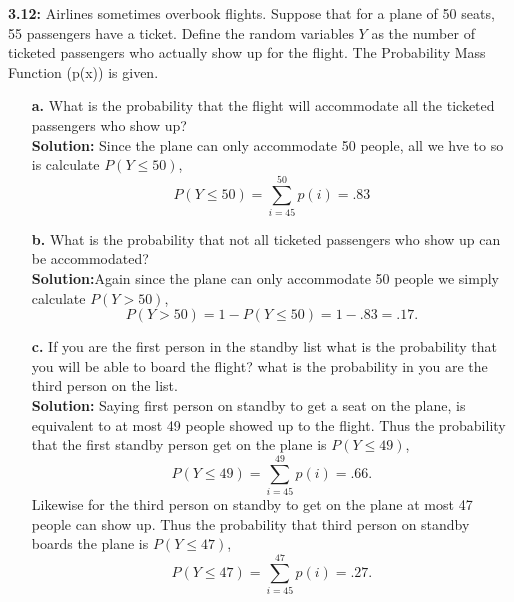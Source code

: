 \documentclass[12pt]{article}
\theoremstyle{homework}
\begin{document}
\textbf{3.12:} Airlines sometimes overbook flights. Suppose that for a plane of 50 seats, 55 passengers have a ticket. Define the random variables $Y$
as the number of ticketed passengers who actually show up for the flight. The Probability Mass Function (p(x)) is given.
\begin{enumerate}
  \item[\textbf{a.}] What is the probability that the flight will accommodate all the ticketed passengers who show up?\\
  
  \textbf{Solution:} Since the plane can only accommodate 50 people, all we hve to so is calculate $P(Y \le 50)$,
  \begin{equation*}
    P(Y \le 50) = \sum_{i = 45}^{50} p(i) = .83
  \end{equation*}
  \vspace{.25in}

  \item[\textbf{b.}] What is the probability that not all ticketed passengers who show up can be accommodated?\\
  
  \textbf{Solution:}Again since the plane can only accommodate 50 people we simply calculate $P(Y>50)$,
  \begin{equation*}
    P(Y > 50) = 1 - P(Y \le 50) = 1 - .83 = .17.
  \end{equation*}
  \vspace{.25in}

  \item[\textbf{c.}] If you are the first person in the standby list what is the probability that you will be able to board the flight? what is the
  probability in you are the third person on the list.\\

  \textbf{Solution:} Saying first person on standby to get a seat on the plane, is equivalent to at most 49 people showed up to the flight. Thus the probability that the 
  first standby person get on the plane is $P(Y \le 49)$,
  \begin{equation*}
    P(Y \le 49) = \sum_{i = 45}^{49} p(i) = .66.
  \end{equation*}
  Likewise for the third person on standby to get on the plane at most 47 people can show up. Thus the probability that third person on standby boards the plane is $P(Y \le 47)$,
  \begin{equation*}
    P(Y \le 47) = \sum_{i = 45}^{47} p(i) = .27.
  \end{equation*}
\end{enumerate}
\end{document}
